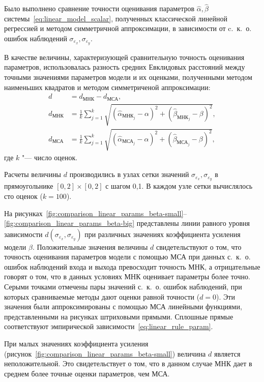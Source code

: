 Было выполнено сравнение точности оценивания параметров
\( \hat{\alpha}, \hat{\beta} \) системы~\eqref{eq:linear_model_scalar},
полученных классической линейной регрессией и методом симметричной аппроксимации,
в зависимости от c.~к.~о. ошибок наблюдений \( \sigma_{\varepsilon_x}, \sigma_{\varepsilon_y} \).

В качестве величины, характеризующей сравнительную точность оценивания параметров,
использовалась разность средних Евклидовых расстояний
между точными значениями параметров модели и их оценками,
полученными методом наименьших квадратов и методом симметриченой аппроксимации:
\begin{equation*}
  \begin{aligned}
    d &= d_{\text{МНК}} - d_{\text{МСА}}, \\
    d_{\text{МНК}} &= \frac{1}{k} \sum_{j=1}^k \sqrt{(\hat{\alpha}_{\text{МНК}_j} - \alpha)^2 + (\hat{\beta}_{\text{МНК}_j} - \beta)^2}, \\
    d_{\text{МСА}} &= \frac{1}{k} \sum_{j=1}^k \sqrt{(\hat{\alpha}_{\text{МСА}_j} - \alpha)^2 + (\hat{\beta}_{\text{МСА}_j} - \beta)^2},
  \end{aligned}
\end{equation*}
где \( k \) "--- число оценок.

Расчеты величины \( d \) производились в узлах сетки значений
\( \sigma_{\varepsilon_x}, \sigma_{\varepsilon_y} \) в прямоугольнике
\( [0, 2] \times [0, 2] \) с шагом 0{,}1.
В каждом узле сетки вычислялось сто оценок (\( k = 100 \)).

На рисунках~\ref{fig:comparison_linear_params_beta-small}--\ref{fig:comparison_linear_params_beta-big}
представлены линии равного уровня зависимости \( d(\sigma_{\varepsilon_x}, \sigma_{\varepsilon_y}) \)
при различных значениях коэффициента усиления модели \( \beta \).
Положительные значения величины \( d \) свидетельствуют о том,
что точность оценивания параметров модели с помощью МСА при данных с.~к.~о.
ошибок наблюдений входа и выхода превосходит точность МНК,
а отрицательные говорят о том, что в данных условиях МНК оценивает параметры более точно.
Серыми точками отмечены пары значений с.~к.~о. ошибок наблюдений,
при которых сравниваемые методы дают оценки равной точности (\( d = 0 \)).
Эти значения были аппроксимированы с помощью МСА линейными функциями,
представленными на рисунках штриховыми прямыми.
Сплошные прямые соответствуют эмпирической зависимости~\eqref{eq:linear_rule_param}.

При малых значениях коэффициента усиления
(рисунок~\ref{fig:comparison_linear_params_beta-small})
величина \( d \) является неположительной.
Это свидетельствует о том, что в данном случае МНК дает в
среднем более точные оценки параметров, чем МСА.

